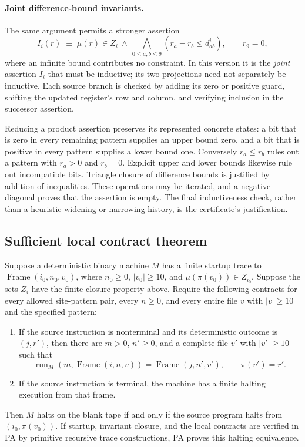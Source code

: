 \paragraph{Joint difference-bound invariants.}
The same argument permits a stronger assertion
\[
 I_i(r)\;\equiv\;
 \mu(r)\in Z_i\ \land\
 \bigwedge_{0\leq a,b\leq9}(r_a-r_b\leq d^i_{ab}),
 \qquad r_9=0,
\]
where an infinite bound contributes no constraint.  In this version
it is the \emph{joint} assertion $I_i$ that must be inductive; its two
projections need not separately be inductive.  Each source branch is
checked by adding its zero or positive guard, shifting the updated
register's row and column, and verifying inclusion in the successor
assertion.

Reducing a product assertion preserves its represented concrete
states: a bit that is zero in every remaining pattern supplies an
upper bound zero, and a bit that is positive in every pattern supplies
a lower bound one.  Conversely $r_a\leq r_b$ rules out a pattern
with $r_a>0$ and $r_b=0$.  Explicit upper and lower bounds likewise
rule out incompatible bits.  Triangle closure of difference bounds
is justified by addition of inequalities.  These operations may be
iterated, and a negative diagonal proves that the assertion is empty.
The final inductiveness check, rather than a heuristic widening or
narrowing history, is the certificate's justification.

\subsection{Sufficient local contract theorem}

\begin{theorem}
Suppose a deterministic binary machine $M$ has a finite startup trace to
$\operatorname{Frame}(i_0,n_0,v_0)$, where $n_0\geq0$, $|v_0|\geq10$,
and $\mu(\pi(v_0))\in Z_{i_0}$.  Suppose the sets $Z_i$ have the
finite closure property above.  Require the following contracts for
every allowed site-pattern pair, every $n\geq0$, and every entire file
$v$ with $|v|\geq10$ and the specified pattern:
\begin{enumerate}
\item If the source instruction is nonterminal and its deterministic
outcome is $(j,r')$, then there are $m>0$, $n'\geq0$, and a complete
file $v'$ with $|v'|\geq10$ such that
\[
 \operatorname{run}_M(m,\operatorname{Frame}(i,n,v))
       =\operatorname{Frame}(j,n',v'),\qquad \pi(v')=r'.
\]
\item If the source instruction is terminal, the machine has a finite
halting execution from that frame.
\end{enumerate}
Then $M$ halts on the blank tape if and only if the source program halts
from $(i_0,\pi(v_0))$.
If startup, invariant closure, and the local contracts are verified in
PA by primitive recursive trace constructions, PA proves this halting
equivalence.
\end{theorem}

